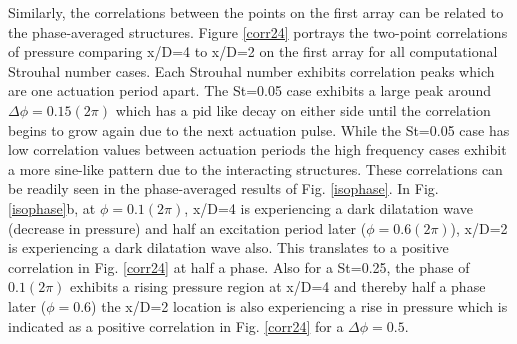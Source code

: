\documentclass[english]{aiaa-tc}
\begin{document}
Similarly, the correlations between the points on the first array can be related to the phase-averaged structures. Figure \ref{corr24} portrays the two-point correlations of pressure comparing x/D=4 to x/D=2 on the first array for all computational Strouhal number cases. Each Strouhal number exhibits correlation peaks which are one actuation period apart. The St=0.05 case exhibits a large peak around $\Delta \phi=0.15(2\pi)$ which has a pid like decay on either side until the correlation begins to grow again due to the next actuation pulse. While the St=0.05 case has low correlation values between actuation periods the high frequency cases exhibit a more sine-like pattern due to the interacting structures.  These correlations can be readily seen in the phase-averaged results of Fig. \ref{isophase}. In Fig. \ref{isophase}b, at $\phi=0.1(2\pi)$, x/D=4 is experiencing a dark dilatation wave (decrease in pressure) and half an excitation period later ($\phi=0.6(2\pi)$), x/D=2 is experiencing a dark dilatation wave also. This translates to a positive correlation in Fig. \ref{corr24} at half a phase. Also for a St=0.25, the phase of $0.1(2\pi)$ exhibits a rising pressure region at x/D=4 and thereby half a phase later ($\phi=0.6$) the x/D=2 location is also experiencing a rise in pressure which is indicated as a positive correlation in Fig. \ref{corr24} for a $\Delta \phi=0.5$.
\end{document}
